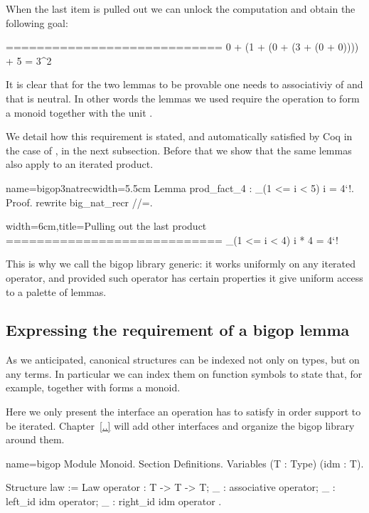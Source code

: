 When the last item is pulled out we can unlock the computation
and obtain the following goal:

\begin{coqout}{}{}
============================
0 + (1 + (0 + (3 + (0 + 0)))) + 5 = 3^2
\end{coqout}

It is clear that for the two lemmas to be provable
one needs to associativiy of  and that  is
neutral.
In other words the lemmas we used require the operation  to form
a monoid together with the unit .

We detail how this requirement is stated, and automatically satisfied by
Coq in the case of , in the next subsection.
Before that we show that the same lemmas also apply to an iterated
product.

\begin{coq}{name=bigop3natrec}{width=5.5cm}
Lemma prod_fact_4 : 
  \prod_(1 <= i < 5) i = 4`!.
Proof.
rewrite big_nat_recr //=.
\end{coq}
\begin{coqout}{}{width=6cm,title=Pulling out the last product}
============================
\prod_(1 <= i < 4) i * 4 = 4`!
\end{coqout}

This is why we call the bigop library generic: it works uniformly on
any iterated operator, and provided such operator has certain
properties it give uniform access to a palette of lemmas.

\subsection{Expressing the requirement of a bigop
lemma}\label{sec:bigoplemmas}

As we anticipated, canonical structures can be indexed not only on
types, but on any terms.  In particular we can index them on function
symbols to state that, for example,  together with 
forms a monoid.

Here we only present the  interface an operation has to
satisfy in order support to be iterated.  Chapter~\ref{..} will add other
interfaces and organize the bigop library around them.

\begin{coq}{name=bigop}{}
Module Monoid.
Section Definitions.
Variables (T : Type) (idm : T).

Structure law := Law {
  operator : T -> T -> T;
  _ : associative operator;
  _ : left_id idm operator;
  _ : right_id idm operator
}.
\end{coq}

